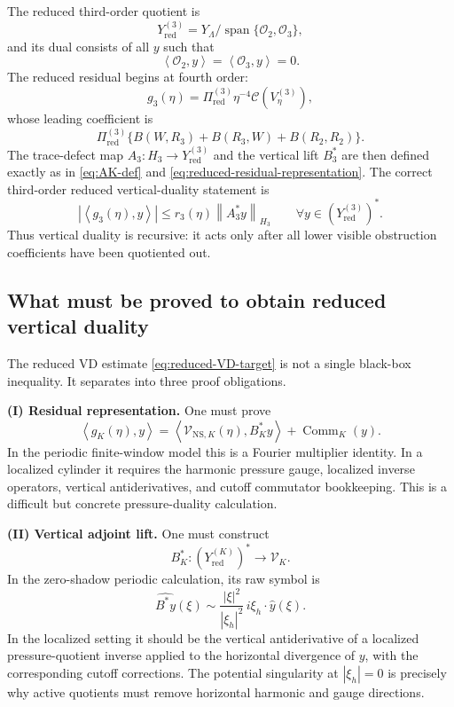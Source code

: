 \documentclass[11pt]{article}
\numberwithin{equation}{section}
\newcommand{\NS}{\mathrm{NS}}
\newcommand{\norm}[2]{\left\|#1\right\|_{#2}}
\newcommand{\ip}[2]{\left\langle #1,#2\right\rangle}
\newcommand{\calC}{\mathcal C}
\newcommand{\calO}{\mathcal O}
\newcommand{\calV}{\mathcal V}
\begin{document}
The reduced third-order quotient is
\begin{equation}\label{eq:Yred3}
Y_{\mathrm{red}}^{(3)}=Y_\Lambda/\operatorname{span}\{\calO_2,\calO_3\},
\end{equation}
and its dual consists of all \(y\) such that
\[
\ip{\calO_2}{y}=\ip{\calO_3}{y}=0.
\]
The reduced residual begins at fourth order:
\begin{equation}\label{eq:g3-def}
g_3(\eta)=
\Pi_{\mathrm{red}}^{(3)}\eta^{-4}\calC(V_\eta^{(3)}),
\end{equation}
whose leading coefficient is
\begin{equation}\label{eq:O4-leading}
\Pi_{\mathrm{red}}^{(3)}
\{B(W,R_3)+B(R_3,W)+B(R_2,R_2)\}.
\end{equation}
The trace-defect map \(A_3:H_3\to Y_{\mathrm{red}}^{(3)}\) and the vertical lift \(B_3^*\) are then defined exactly as in \eqref{eq:AK-def} and \eqref{eq:reduced-residual-representation}.  The correct third-order reduced vertical-duality statement is
\begin{equation}\label{eq:VD3}
|\ip{g_3(\eta)}{y}|
\le
r_3(\eta)\norm{A_3^*y}{H_3}
\qquad
\forall y\in (Y_{\mathrm{red}}^{(3)})^*.
\end{equation}
Thus vertical duality is recursive: it acts only after all lower visible obstruction coefficients have been quotiented out.

\subsection{What must be proved to obtain reduced vertical duality}\label{subsec:proof-obligations-reduced-vd}

The reduced VD estimate \eqref{eq:reduced-VD-target} is not a single black-box inequality.  It separates into three proof obligations.

\medskip
\noindent\textbf{(I) Residual representation.}
One must prove
\begin{equation}\label{eq:obligation-residual-representation}
\ip{g_K(\eta)}{y}
=
\ip{\calV_{\NS,K}(\eta)}{B_K^*y}
+\operatorname{Comm}_K(y).
\end{equation}
In the periodic finite-window model this is a Fourier multiplier identity.  In a localized cylinder it requires the harmonic pressure gauge, localized inverse operators, vertical antiderivatives, and cutoff commutator bookkeeping.  This is a difficult but concrete pressure-duality calculation.

\medskip
\noindent\textbf{(II) Vertical adjoint lift.}
One must construct
\[
B_K^*:(Y_{\mathrm{red}}^{(K)})^*\to\calV_K.
\]
In the zero-shadow periodic calculation, its raw symbol is
\[
\widehat{B^*y}(\xi)
\sim
\frac{|\xi|^2}{|\xi_h|^2}\,i\xi_h\cdot\widehat y(\xi).
\]
In the localized setting it should be the vertical antiderivative of a localized pressure-quotient inverse applied to the horizontal divergence of \(y\), with the corresponding cutoff corrections.  The potential singularity at \(|\xi_h|=0\) is precisely why active quotients must remove horizontal harmonic and gauge directions.
\end{document}
